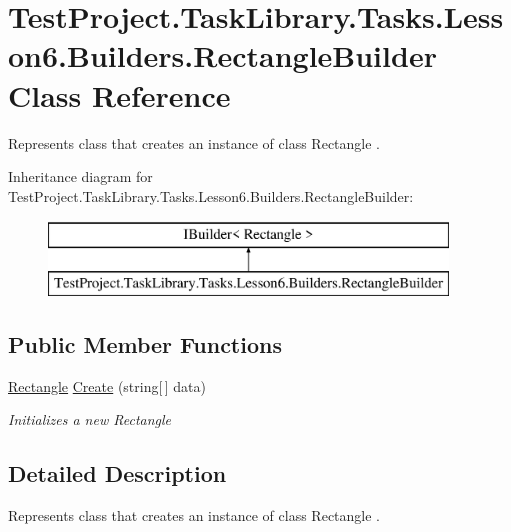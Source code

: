 \hypertarget{class_test_project_1_1_task_library_1_1_tasks_1_1_lesson6_1_1_builders_1_1_rectangle_builder}{}\section{Test\+Project.\+Task\+Library.\+Tasks.\+Lesson6.\+Builders.\+Rectangle\+Builder Class Reference}
\label{class_test_project_1_1_task_library_1_1_tasks_1_1_lesson6_1_1_builders_1_1_rectangle_builder}


Represents class that creates an instance of class Rectangle .  


Inheritance diagram for Test\+Project.\+Task\+Library.\+Tasks.\+Lesson6.\+Builders.\+Rectangle\+Builder\+:\begin{figure}[H]
\begin{center}
\leavevmode
\includegraphics[height=2.000000cm]{class_test_project_1_1_task_library_1_1_tasks_1_1_lesson6_1_1_builders_1_1_rectangle_builder}
\end{center}
\end{figure}
\subsection*{Public Member Functions}
\begin{DoxyCompactItemize}
\item 
\mbox{\hyperlink{class_test_project_1_1_task_library_1_1_tasks_1_1_lesson6_1_1_models_1_1_rectangle}{Rectangle}} \mbox{\hyperlink{class_test_project_1_1_task_library_1_1_tasks_1_1_lesson6_1_1_builders_1_1_rectangle_builder_aa3c17c0892a5ad74eedd86a99b05f6ca}{Create}} (string\mbox{[}$\,$\mbox{]} data)
\begin{DoxyCompactList}\small\item\em Initializes a new Rectangle \end{DoxyCompactList}\end{DoxyCompactItemize}


\subsection{Detailed Description}
Represents class that creates an instance of class Rectangle . 



